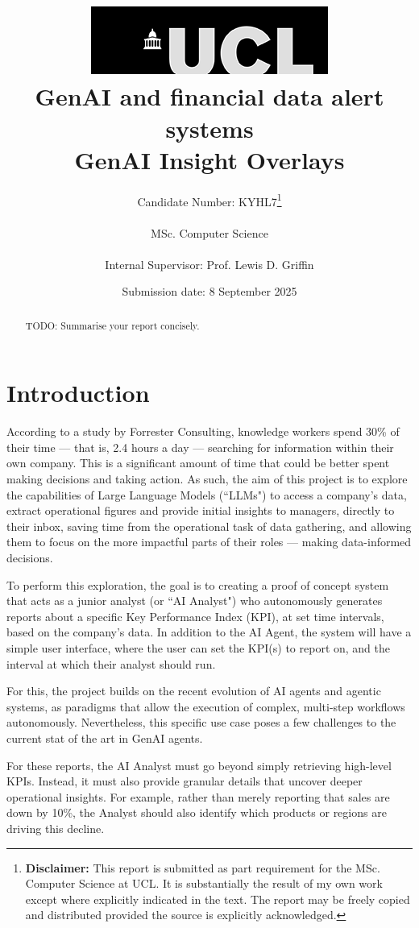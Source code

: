 \documentclass[a4paper]{report}
\title{{\vspace{-14em} \includegraphics[scale=0.4]{images/ucl_logo.png}}\\
{{\Huge GenAI and financial data alert systems}}\\
{\large GenAI Insight Overlays}\\
}
\date{Submission date: 8 September 2025}
\author{Candidate Number: KYHL7\thanks{
{\bf Disclaimer:}
This report is submitted as part requirement for the MSc. Computer Science at UCL. It is substantially the result of my own work except where explicitly indicated in the text. The report may be freely copied and distributed provided the source is explicitly acknowledged.}
\\ \\
MSc. Computer Science\\ \\
Internal Supervisor: Prof. Lewis D. Griffin}
\begin{document}
 
\onehalfspacing

\maketitle
\begin{abstract}
TODO: Summarise your report concisely.
\end{abstract}

\tableofcontents

\setcounter{page}{1}


\chapter{Introduction}
\label{chapter:introduction}

According to a study by Forrester Consulting, knowledge workers spend 30\% of their time --- that is, 2.4 hours a day --- searching for information within their own company\cite{forrester2022}. This is a significant amount of time that could be better spent making decisions and taking action. As such, the aim of this project is to explore the capabilities of Large Language Models (``LLMs") to access a company's data, extract operational figures and provide initial insights to managers, directly to their inbox, saving time from the operational task of data gathering, and allowing them to focus on the more impactful parts of their roles --- making data-informed decisions.

To perform this exploration, the goal is to creating a proof of concept system that acts as a junior analyst (or ``AI Analyst") who autonomously generates reports about a specific Key Performance Index (KPI), at set time intervals, based on the company's data. In addition to the AI Agent, the system will have a simple user interface, where the user can set the KPI(s) to report on, and the interval at which their analyst should run.

For this, the project builds on the recent evolution of AI agents and agentic systems, as paradigms that allow the execution of complex, multi-step workflows autonomously. Nevertheless, this specific use case poses a few challenges to the current stat of the art in GenAI agents.

For these reports, the AI Analyst must go beyond simply retrieving high-level KPIs. Instead, it must also provide granular details that uncover deeper operational insights. For example, rather than merely reporting that sales are down by 10\%, the Analyst should also identify which products or regions are driving this decline.
\end{document}
